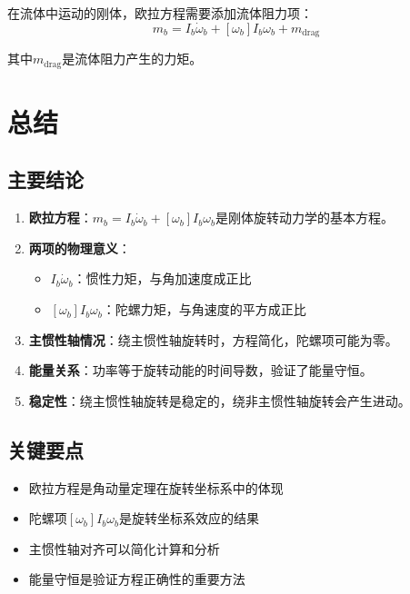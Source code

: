 \documentclass[12pt,a4paper]{article}
\begin{document}
在流体中运动的刚体，欧拉方程需要添加流体阻力项：
\begin{equation}
m_b = I_b \dot{\omega}_b + [\omega_b] I_b \omega_b + m_{\text{drag}}
\end{equation}

其中$m_{\text{drag}}$是流体阻力产生的力矩。

\section{总结}

\subsection{主要结论}

\begin{enumerate}
\item \textbf{欧拉方程}：$m_b = I_b \dot{\omega}_b + [\omega_b] I_b \omega_b$是刚体旋转动力学的基本方程。

\item \textbf{两项的物理意义}：
\begin{itemize}
\item $I_b \dot{\omega}_b$：惯性力矩，与角加速度成正比
\item $[\omega_b] I_b \omega_b$：陀螺力矩，与角速度的平方成正比
\end{itemize}

\item \textbf{主惯性轴情况}：绕主惯性轴旋转时，方程简化，陀螺项可能为零。

\item \textbf{能量关系}：功率等于旋转动能的时间导数，验证了能量守恒。

\item \textbf{稳定性}：绕主惯性轴旋转是稳定的，绕非主惯性轴旋转会产生进动。
\end{enumerate}

\subsection{关键要点}

\begin{itemize}
\item 欧拉方程是角动量定理在旋转坐标系中的体现
\item 陀螺项$[\omega_b] I_b \omega_b$是旋转坐标系效应的结果
\item 主惯性轴对齐可以简化计算和分析
\item 能量守恒是验证方程正确性的重要方法
\end{itemize}
\end{document}
